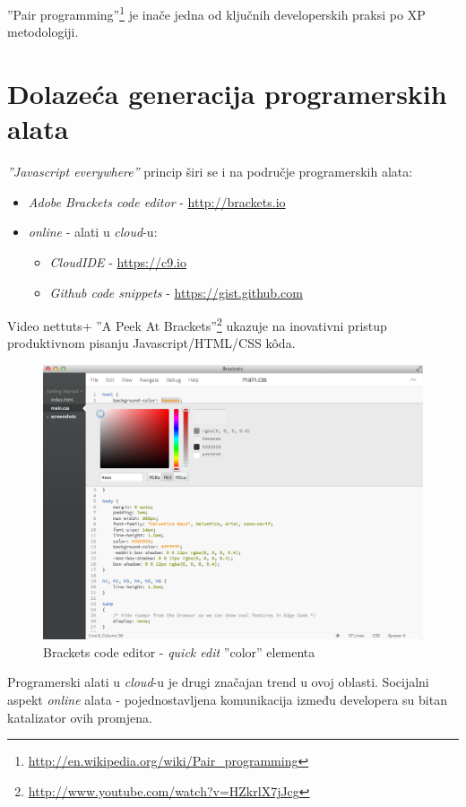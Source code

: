 \documentclass[times, utf8, seminar]{fit}
\begin{document}
''Pair programming''\footnote{\url{http://en.wikipedia.org/wiki/Pair_programming}} je inače  jedna od ključnih developerskih praksi po XP metodologiji\citep{agileart}.

\section{Dolazeća generacija programerskih alata}

\emph{''Javascript everywhere''} princip širi se i na područje programerskih alata:
\begin{itemize}
   \item \emph{Adobe Brackets code editor} - \url{http://brackets.io}
   \item \emph{online} - alati u \emph{cloud}-u:
   \begin{itemize}
     \item \emph{CloudIDE} - \url{https://c9.io}
     \item \emph{Github code snippets} - \url{https://gist.github.com}
   \end{itemize}
\end{itemize}

Video nettuts+ ''A Peek At Brackets''\footnote{\url{http://www.youtube.com/watch?v=HZkrlX7jJcg}} ukazuje na inovativni pristup produktivnom pisanju Javascript/HTML/CSS k\^oda.

\begin{figure}[H]
\centering
\includegraphics[width=12cm]{img/brackets_color_edit.png}
\caption{Brackets code editor - \emph{quick edit} ''color'' elementa}
\end{figure}

Programerski alati u \emph{cloud}-u je drugi značajan trend u ovoj oblasti. Socijalni aspekt \emph{online} alata - pojednostavljena komunikacija između developera su bitan katalizator ovih promjena.
\end{document}
